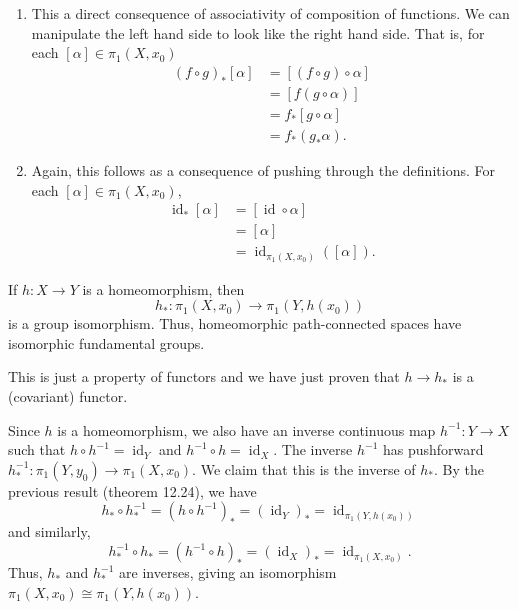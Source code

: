 \documentclass[12 pt, letterpaper]{hmcpset}
\begin{document}
\begin{solution}
	\begin{enumerate}
		\item This a direct consequence of associativity of composition of functions. We can manipulate the left hand side to look like the right hand side. That is, for each $[\alpha] \in \pi_{1}(X, x_{0})$
			\begin{align*}
				(f \circ g)_{*}[\alpha] & = [(f \circ g) \circ \alpha] \\
							& = [f (g \circ \alpha)] \\
							& = f_{*} [g \circ \alpha] \\
							& = f_{*}(g_{*} \alpha).
			\end{align*}

		\item Again, this follows as a consequence of pushing through the definitions. For each $[\alpha] \in \pi_{1}(X, x_{0})$,
			\begin{align*}
				\operatorname{id}_{*} [\alpha] & = [\operatorname{id} \circ \alpha] \\
							       & = [\alpha] \\
							       & = \operatorname{id}_{\pi_{1}(X, x_{0})}([\alpha]).
			\end{align*}
	\end{enumerate}
\end{solution}

\pagebreak

\begin{problem}[12.25]
	If $h : X \to Y$ is a homeomorphism, then
	\[
		h_{*} : \pi_{1}(X, x_{0}) \to \pi_{1}(Y, h(x_{0}))
	\]
	is a group isomorphism. Thus, homeomorphic path-connected spaces have isomorphic fundamental groups.
\end{problem}

\begin{solution}
	This is just a property of functors and we have just proven that $h \to h_{*}$ is a (covariant) functor.

	Since $h$ is a homeomorphism, we also have an inverse continuous map $h^{-1} : Y \to X$ such that $h \circ h^{-1} = \operatorname{id}_{Y}$ and $h^{-1} \circ h = \operatorname{id}_{X}$. The inverse $h^{-1}$ has pushforward $h^{-1}_{*} : \pi_{1}(Y, y_{0}) \to \pi_{1}(X, x_{0})$. We claim that this is the inverse of $h_{*}$. By the previous result (theorem 12.24), we have
	\[
			h_{*} \circ h^{-1}_{*} = (h \circ h^{-1})_{*} = (\operatorname{id}_{Y})_{*} = \operatorname{id}_{\pi_{1}(Y, h(x_{0}))}
	\]
	and similarly,
	\[
			h^{-1}_{*} \circ h_{*} = (h^{-1} \circ h)_{*} = (\operatorname{id}_{X})_{*} = \operatorname{id}_{\pi_{1}(X, x_{0})}.
	\]
	Thus, $h_{*}$ and $h_{*}^{-1}$ are inverses, giving an isomorphism $\pi_{1}(X, x_{0}) \cong \pi_{1}(Y, h(x_{0}))$.
\end{solution}
\end{document}
